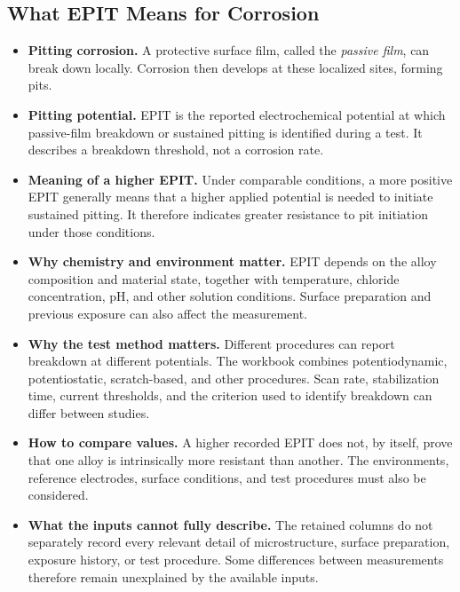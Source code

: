 \documentclass[11pt]{article}
\newenvironment{notes}
  {\begin{itemize}\setlength{\itemsep}{0.45em}\setlength{\parsep}{0pt}}
  {\end{itemize}}
\begin{document}
\subsection{What EPIT Means for Corrosion}
\label{sec:epit-meaning}

\begin{notes}
    \item \textbf{Pitting corrosion.} A protective surface film, called the
    \emph{passive film}, can break down locally. Corrosion then develops
    at these localized sites, forming pits.

    \item \textbf{Pitting potential.} EPIT is the reported electrochemical
    potential at which passive-film breakdown or sustained pitting is
    identified during a test. It describes a breakdown threshold, not a
    corrosion rate.

    \item \textbf{Meaning of a higher EPIT.} Under comparable conditions,
    a more positive EPIT generally means that a higher applied potential
    is needed to initiate sustained pitting. It therefore indicates
    greater resistance to pit initiation under those conditions.

    \item \textbf{Why chemistry and environment matter.} EPIT depends on
    the alloy composition and material state, together with temperature,
    chloride concentration, pH, and other solution conditions. Surface
    preparation and previous exposure can also affect the measurement.

    \item \textbf{Why the test method matters.} Different procedures can
    report breakdown at different potentials. The workbook combines
    potentiodynamic, potentiostatic, scratch-based, and other procedures.
    Scan rate, stabilization time, current thresholds, and the criterion
    used to identify breakdown can differ between studies.

    \item \textbf{How to compare values.} A higher recorded EPIT does not,
    by itself, prove that one alloy is intrinsically more resistant than
    another. The environments, reference electrodes, surface conditions,
    and test procedures must also be considered.

    \item \textbf{What the inputs cannot fully describe.} The retained
    columns do not separately record every relevant detail of
    microstructure, surface preparation, exposure history, or test
    procedure. Some differences between measurements therefore remain
    unexplained by the available inputs.
\end{notes}
\end{document}
